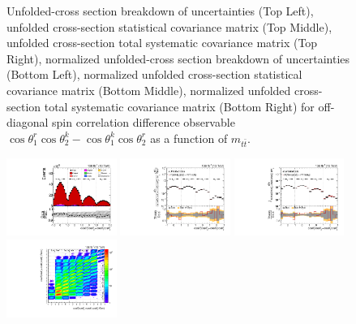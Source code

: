 \begin{figure}[htb]
\begin{center}
\caption{Unfolded-cross section breakdown of uncertainties (Top Left), unfolded cross-section statistical covariance matrix (Top Middle), unfolded cross-section total systematic covariance matrix (Top Right), normalized unfolded-cross section breakdown of uncertainties (Bottom Left), normalized unfolded cross-section statistical covariance matrix (Bottom Middle), normalized unfolded cross-section total systematic covariance matrix (Bottom Right) for off-diagonal spin correlation difference observable $\cos\theta_{1}^{r}\cos\theta_{2}^{k}-\cos\theta_{1}^{k}\cos\theta_{2}^{r}$ as a function of $m_{t\bar{t}}$.}
\label{fig:c_Mrk_mttbar_uncertainties}
\end{center}
\end{figure}
\clearpage
\begin{figure}[htb]
\begin{center}
 \includegraphics[width=0.32\textwidth]{fig_fullRun2UL/controlplots/combined/Hyp_LLBarCPnr_vs_TTBarMass.pdf}
 \includegraphics[width=0.32\textwidth]{fig_fullRun2UL/unfolding/combined/UnfoldedResults_c_Pnr_mttbar.pdf}
 \includegraphics[width=0.32\textwidth]{fig_fullRun2UL/unfolding/combined/UnfoldedResultsNorm_c_Pnr_mttbar.pdf} \\
 \includegraphics[width=0.32\textwidth]{fig_fullRun2UL/unfolding/combined/ResponseMatrix_c_Pnr_mttbar.pdf}

\end{center}
\end{figure}

